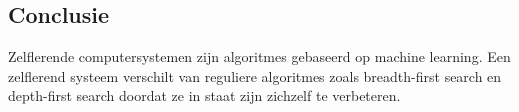 \subsection{Conclusie}
Zelflerende computersystemen zijn algoritmes gebaseerd op machine learning. Een zelflerend systeem verschilt van reguliere algoritmes zoals breadth-first search en depth-first search doordat ze in staat zijn zichzelf te verbeteren.


